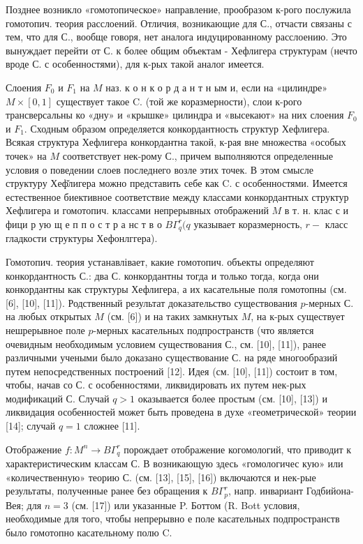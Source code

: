 \documentclass[10pt]{article}
\begin{document}
Позднее возникло «гомотопическое» направление, прообразом к-рого послужила гомотопич. теория расслоений. Отличия, возникающие для С., отчасти связаны с тем, что для С., вообще говоря, нет аналога индуцированному расслоению. Это вынуждает перейти от С. к более общим объектам - Хефлигера структурам (нечто вроде С. с особенностями), для к-рых такой аналог имеется.



Слоения $F_{0}$ и $F_{1}$ на $M$ наз. к о н к о р д а н т н ым и, если на «цилиндре» $M \times[0,1]$ существует такое $\mathrm{C}$. (той же коразмерности), слои к-рого трансверсальны ко «дну» и «крышке» цилиндра и «высекают» на них слоения $F_{0}$ и $F_{1}$. Сходным образом определяется конкордантность структур Хефлигера. Всякая структура Хефлигера конкордантна такой, к-рая вне множества «особых точек» на $M$ соответствует нек-рому С., причем выполняются определенные условия о поведении слоев последнего возле этих точек. В этом смысле структуру Хеф̆лигера можно представить себе как C. с особенностями. Имеется естественное биективное соответствие между классами конкордантных структур Хефлигера и гомотопич. классами непрерывных отображений $M$ в т. н. клас с и фици р ую щ е п п о с т р а нс т в о $B \Gamma_{q}^{r}(q$ указывает коразмерность, $r-$ класс гладкости структуры Хефонлггера).



Гомотопич. теория устанавлівает, какие гомотопич. объекты определяют конкордантность С.: два С. конкордантны тогда и только тогда, когда они конкордантны как структуры Хефлигера, а их касательные поля гомотопны (см. [6], [10], [11]). Родственный результат доказательство существования $p$-мерных С. на любых открытых $M$ (см. [6]) и на таких замкнутых $M$, на к-рых существует нешрерывное поле $p$-мерных касательных подпространств (что является очевидным необходимым условием существования С., см. [10], [11]), ранее различными учеными было доказано существование С. на ряде многообразий путем непосредственных построений [12]. Идея (см. [10], [11]) состоит в том, чтобы, начав со С. с особенностями, ликвидировать их путем нек-рых модификаций С. Случай $q>1$ оказывается более простым (см. [10], [13]) и ликвидация особенностей может быть проведена в духе «геометрической» теории [14]; случай $q=1$ сложнее [11].



Отображение $f: M^{n} \rightarrow B \Gamma_{q}^{r}$ порождает отображение когомологий, что приводит к характеристическим классам С. В возникающую здесь «гомологичес кую» или «количественную» теорию С. (см. [13], [15], [16]) включаются и нек-рые результаты, полученные ранее без обращения к $B \Gamma_{p}^{r}$, напр. инвариант Годбийона-Вея; для $n=3$ (см. [17]) или указанные P. Боттом (R. Bott условия, необходимые для того, чтобы непрерывно е поле касательных подпространств было гомотопно касательному полю $\mathrm{C}$.
\end{document}
